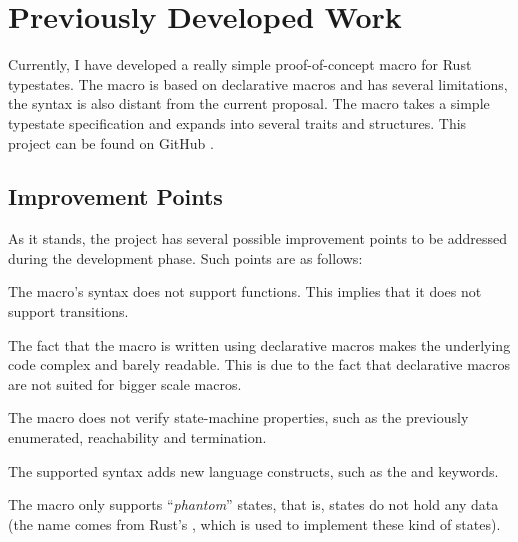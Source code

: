 \section{Previously Developed Work}

Currently, I have developed a really simple proof-of-concept macro for Rust typestates.
The macro is based on declarative macros and has several limitations,
the syntax is also distant from the current proposal.
The macro takes a simple typestate specification and expands into several traits and structures.
This project can be found on GitHub \autocite{Duarte2020a}.

\subsection{Improvement Points}

As it stands, the project has several possible improvement points to be addressed during the development phase.
Such points are as follows:
\begin{compactitem}
    \item The macro's syntax does not support functions. This implies that it does not support transitions.
    \item The fact that the macro is written using declarative macros makes the underlying code complex and barely readable.
    This is due to the fact that declarative macros are not suited for bigger scale macros.
    \item The macro does not verify state-machine properties, such as the previously enumerated, reachability and termination.
    \item The supported syntax adds new language constructs, such as the  and  keywords.
    \item The macro only supports “\emph{phantom}” states, that is, states do not hold any data
    (the name comes from Rust's , which is used to implement these kind of states).
\end{compactitem}



